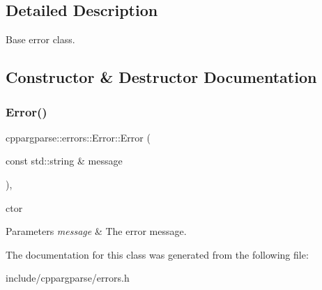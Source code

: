 \subsection{Detailed Description}
Base error class. 

\subsection{Constructor \& Destructor Documentation}
\mbox{\label{classcppargparse_1_1errors_1_1Error_a41c12888d001504fbaec210c5574b91a}} 
\subsubsection{\texorpdfstring{Error()}{Error()}}
{\footnotesize\ttfamily cppargparse\+::errors\+::\+Error\+::\+Error (\begin{DoxyParamCaption}\item[{const std\+::string \&}]{message }\end{DoxyParamCaption})\hspace{0.3cm}{\ttfamily [inline]}, {\ttfamily [explicit]}}



c\textquotesingle{}tor 


\begin{DoxyParams}{Parameters}
{\em message} & The error message. \\
\hline
\end{DoxyParams}


The documentation for this class was generated from the following file\+:\begin{DoxyCompactItemize}
\item 
include/cppargparse/errors.\+h\end{DoxyCompactItemize}
